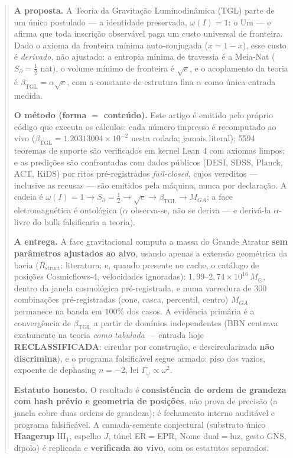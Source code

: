 \documentclass[11pt]{article}
\newcommand{\bTGL}{\beta_{\mathrm{TGL}}}\newcommand{\Msun}{M_{\odot}}\newcommand{\TGL}{\mathrm{TGL}}
\theoremstyle{definition}\newtheorem{deriv}{Derivação}
\begin{document}
\begin{abstract}

\textbf{A proposta.} A Teoria da Gravitação Luminodinâmica (TGL) parte de um único postulado --- a identidade preservada, $\omega(I)=1$: o Um --- e afirma que toda inscrição observável paga um custo universal de fronteira. Dado o axioma da fronteira mínima auto-conjugada ($x=1-x$), esse custo é \emph{derivado}, não ajustado: a entropia mínima de travessia é a Meia-Nat ($S_\partial=\tfrac12$ nat), o volume mínimo de fronteira é $\sqrt e$, e o acoplamento da teoria é $\bTGL=\alpha\sqrt e$, com a constante de estrutura fina $\alpha$ como única entrada medida.

\textbf{O método (forma $=$ conteúdo).} Este artigo é emitido pelo próprio código que executa os cálculos: cada número impresso é recomputado ao vivo ($\bTGL=1.20313004\times10^{-2}$ nesta rodada; jamais literal); 5594 teoremas de suporte são verificados em kernel Lean 4 com axiomas limpos; e as predições são confrontadas com dados públicos (DESI, SDSS, Planck, ACT, KiDS) por ritos pré-registrados \emph{fail-closed}, cujos vereditos --- inclusive as recusas --- são emitidos pela máquina, nunca por declaração. A cadeia é $\omega(I)=1\to S_\partial=\tfrac12\to\sqrt e\to\bTGL\to M_{GA}$; a face eletromagnética é ontológica ($\alpha$ observa-se, não se deriva --- e derivá-la $\alpha$-livre do bulk falsificaria a teoria).

\textbf{A entrega.} A face gravitacional computa a massa do Grande Atrator \textbf{sem parâmetros ajustados ao alvo}, usando apenas a extensão geométrica da bacia ($R_{\mathrm{struct}}$: literatura; e, quando presente no cache, o catálogo de posições Cosmicflows-4, velocidades ignoradas): $1{,}99$--$2{,}74\times10^{16}\,\Msun$, dentro da janela cosmológica pré-registrada, e numa varredura de $300$ combinações pré-registradas (cone, casca, percentil, centro) $M_{GA}$ permanece na banda em $100\%$ dos casos. A evidência primária é a convergência de $\bTGL$ a partir de domínios independentes (BBN centrava exatamente na teoria \emph{como tabulada} --- entrada hoje \textbf{RECLASSIFICADA}: circular por construção, e descircularizada \textbf{não discrimina}), e o programa falsificável segue armado: piso dos vazios, expoente de dephasing $n=-2$, lei $\Gamma_\omega\propto\omega^2$.

\textbf{Estatuto honesto.} O resultado é \textbf{consistência de ordem de grandeza com hash prévio e geometria de posições}, não prova de precisão (a janela cobre duas ordens de grandeza); é fechamento interno auditável e programa falsificável. A camada-semente conjectural (substrato único \textbf{Haagerup} $\mathrm{III}_1$, espelho $J$, túnel ER$=$EPR, Nome dual$=$luz, gesto GNS, dipolo) é replicada e \textbf{verificada ao vivo}, com os estatutos separados.

\end{abstract}
\end{document}
